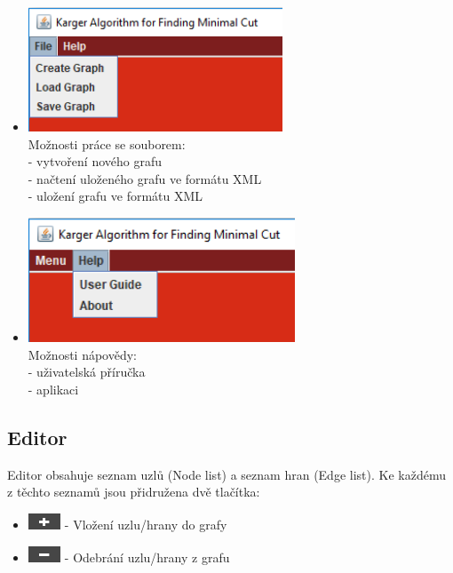 \documentclass[../projekt.tex]{subfiles}
\begin{document}
\begin{itemize}
    \item \includegraphics[height=10em]{obrazky-figures/file.png} \\Možnosti práce se souborem: \\ - vytvoření nového grafu \\ - načtení uloženého grafu ve formátu XML \\ - uložení grafu ve formátu XML
    \item \includegraphics[height=10em]{obrazky-figures/help.png} \\Možnosti nápovědy: \\ - uživatelská příručka \\ - aplikaci
\end{itemize}



\subsection{Editor}

Editor obsahuje seznam uzlů (Node list) a seznam hran (Edge list). Ke každému z těchto seznamů jsou přidružena dvě tlačítka: 

\begin{itemize}
    \item \includegraphics[height=1.3em]{obrazky-figures/addButton.png} - Vložení uzlu/hrany do grafy
    \item \includegraphics[height=1.3em]{obrazky-figures/removeButton.png} - Odebrání uzlu/hrany z grafu
\end{itemize}
\end{document}
